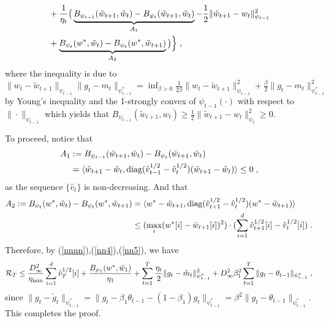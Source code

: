 \documentclass[twoside]{article}
\makeatletter
\renewenvironment{proof}[1][\proofname]{%
   \par\pushQED{\qed}\normalfont%
   \topsep6\p@\@plus6\p@\relax
   \trivlist\item[\hskip\labelsep\bfseries#1]%
   \ignorespaces
}{%
   \popQED\endtrivlist\@endpefalse
}
\makeatother
\begin{document}
\begin{proof}
\begin{equation}
\begin{aligned}
 &  + \frac{1}{\eta_t} \big(\underbrace{B_{\psi_{t-1}}(\tilde{w}_{t+1}, \tilde{w}_{t}) - B_{\psi_t}(\tilde{w}_{t+1}, \tilde{w}_{t}) }_{A_1}- \frac{1}{2} \| \tilde{w}_{t+1} - w_t \|_{\psi_{t-1}}^2\\
 &+\underbrace{B_{\psi_t}( w^*, \tilde{w}_{t}) -B_{\psi_t}(w^*,  \tilde{w}_{t+1} )}_{A_2}  \big) \Big\} \;,
\end{aligned}
\end{equation}
where the inequality is due to $ \| w_t - \tilde{w}_{t+1}   \|_{\psi_{t-1}} \| g_t - m_t  \|_{\psi_{t-1}^*} = \inf_{ \beta > 0 }   \frac{1}{2\beta} \| w_t - \tilde{w}_{t+1} \|_{\psi_{t-1}}^2 +  \frac{\beta}{2} \| g_t - m_t  \|_{\psi_{t-1}^*}^2$ by Young's inequality and the 1-strongly convex of $\psi_{t-1}(\cdot)$ with respect to $\| \cdot \|_{\psi_{t-1}}$ which yields that $B_{\psi_{t-1}}(\tilde{w}_{t+1}, w_t )  \geq \frac{1}{2} \| \tilde{w}_{t+1} -  w_t  \|^2_{\psi_t} \geq 0$. 

To proceed, notice that
\begin{equation} \label{nn5}
\begin{aligned}
A_1& :=  B_{\psi_{t-1}}(\tilde{w}_{t+1}, \tilde{w}_{t}) - B_{\psi_t}(\tilde{w}_{t+1}, \tilde{w}_{t})  \\
& = \langle \tilde{w}_{t+1} - \tilde{w}_{t} , \text{diag}(\hat{v}_{t-1}^{1/2} -\hat{v}_t^{1/2} ) ( \tilde{w}_{t+1}- \tilde{w}_{t} ) \rangle \leq 0 \;,
\end{aligned}
\end{equation}
as the sequence $\{\hat{v}_t\}$ is non-decreasing. And that
\begin{equation}  \label{nn4}
\begin{aligned}
A_2 := B_{\psi_t}( w^*, \tilde{w}_{t}) -B_{\psi_t}(w^*,  \tilde{w}_{t+1} )  &= \langle w^* - \tilde{w}_{t+1}  , \text{diag}(\hat{v}_{t+1}^{1/2} -\hat{v}_t^{1/2} ) ( w^* - \tilde{w}_{t+1}  ) \rangle\\
  & \leq ( \max_i (w^*[i] -  \tilde{w}_{t+1} [i] )^2  )\cdot ( \sum_{i=1}^d \hat{v}_{t+1}^{1/2}[i] -\hat{v}_t^{1/2}[i] ) \;.
\end{aligned}
\end{equation}
Therefore, by (\ref{nnnn}),(\ref{nn4}),(\ref{nn5}), we have
\begin{equation}\notag
\begin{aligned}
\mathcal{R}_T \leq  \frac{D_{\infty}^2}{\eta_{\min}}  \sum_{i=1}^d \hat{v}_{T}^{1/2}[i] + \frac{ B_{\psi_1}(w^*, \tilde{w}_{1})}{\eta_1}
+ \sum_{t=1}^T\frac{\eta_t}{2} \| g_t - \tilde{m}_t  \|_{\psi_{t-1}^*}^2  +D_{\infty}^2 \beta_1^2  \sum_{t=1}^T \| g_t - \theta_{t-1}  \|_{\psi_{t-1}^*}  \;,
\end{aligned}
\end{equation}
since $  \| g_t - \tilde{g}_t  \|_{\psi_{t-1}^*} =  \| g_t - \beta_1 \theta_{t-1} -(1- \beta_1) g_t \|_{\psi_{t-1}^*} = \beta^2 \| g_t - \theta_{t-1}  \|_{\psi_{t-1}^*} $.
This completes the proof.

\end{proof}
\end{document}
